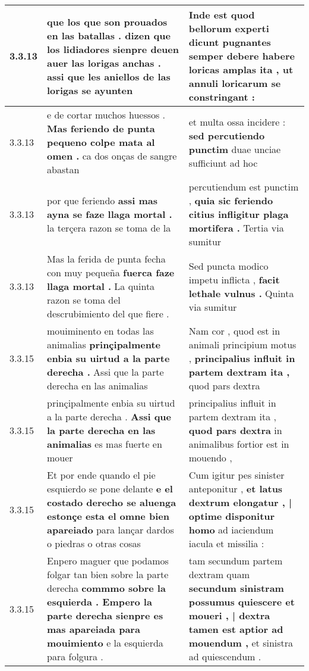 \begin{tabular}{|p{1cm}|p{6.5cm}|p{6.5cm}|}
3.3.13 & que los que son prouados en las batallas . \textbf{ dizen que los lidiadores sienpre deuen auer las lorigas anchas . } assi que les aniellos de las lorigas se ayunten & Inde est quod bellorum experti dicunt pugnantes \textbf{ semper debere habere loricas amplas ita , } ut annuli loricarum se constringant : \\\hline
3.3.13 & e de cortar muchos huessos . \textbf{ Mas feriendo de punta pequeno colpe mata al omen . } ca dos onças de sangre abastan & et multa ossa incidere : \textbf{ sed percutiendo punctim } duae unciae sufficiunt ad hoc \\\hline
3.3.13 & por que feriendo \textbf{ assi mas ayna se faze llaga mortal . } la terçera razon se toma de la & percutiendum est punctim , \textbf{ quia sic feriendo citius infligitur plaga mortifera . } Tertia via sumitur \\\hline
3.3.13 & Mas la ferida de punta fecha con muy pequeña \textbf{ fuerca faze llaga mortal . } La quinta razon se toma del descrubimiento del que fiere . & Sed puncta modico impetu inflicta , \textbf{ facit lethale vulnus . } Quinta via sumitur \\\hline
3.3.15 & mouiminento en todas las animalias \textbf{ prinçipalmente enbia su uirtud a la parte derecha . } Assi que la parte derecha en las animalias & Nam cor , quod est in animali principium motus , \textbf{ principalius influit in partem dextram ita , } quod pars dextra \\\hline
3.3.15 & prinçipalmente enbia su uirtud a la parte derecha . \textbf{ Assi que la parte derecha en las animalias } es mas fuerte en mouer & principalius influit in partem dextram ita , \textbf{ quod pars dextra } in animalibus fortior est in mouendo , \\\hline
3.3.15 & Et por ende quando el pie esquierdo se pone delante \textbf{ e el costado derecho se aluenga estonçe esta el omne bien apareiado } para lançar dardos o piedras o otras cosas & Cum igitur pes sinister anteponitur , \textbf{ et latus dextrum elongatur , | optime disponitur homo } ad iaciendum iacula et missilia : \\\hline
3.3.15 & Enpero maguer que podamos folgar tan bien sobre la parte derecha \textbf{ commmo sobre la esquierda . Empero la parte derecha sienpre es mas apareiada para mouimiento } e la esquierda para folgura . & tam secundum partem dextram quam \textbf{ secundum sinistram possumus quiescere et moueri , | dextra tamen est aptior ad mouendum , } et sinistra ad quiescendum . \\\hline

\end{tabular}
